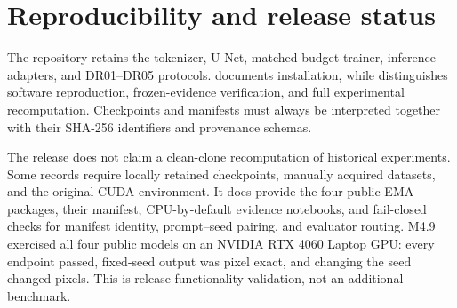 \section{Reproducibility and release status}\label{sec:reproducibility}
The repository retains the tokenizer, U-Net, matched-budget trainer, inference adapters, and DR01--DR05 protocols.  documents installation, while  distinguishes software reproduction, frozen-evidence verification, and full experimental recomputation. Checkpoints and manifests must always be interpreted together with their SHA-256 identifiers and provenance schemas.

The release does not claim a clean-clone recomputation of historical experiments. Some records require locally retained checkpoints, manually acquired datasets, and the original CUDA environment. It does provide the four public EMA packages, their manifest, CPU-by-default evidence notebooks, and fail-closed checks for manifest identity, prompt--seed pairing, and evaluator routing. M4.9 exercised all four public models on an NVIDIA RTX 4060 Laptop GPU: every endpoint passed, fixed-seed output was pixel exact, and changing the seed changed pixels. This is release-functionality validation, not an additional benchmark.
